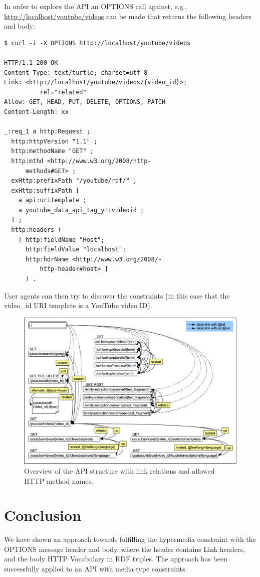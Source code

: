 \documentclass{acm_proc_article-sp}
\begin{document}
In order to explore the API an OPTIONS call against, e.g., \url{http://localhost/youtube/videos} can be made that returns the following headers and body:
\begin{verbatim}
$ curl -i -X OPTIONS http://localhost/youtube/videos

HTTP/1.1 200 OK
Content-Type: text/turtle; charset=utf-8
Link: <http://localhost/youtube/videos/{video_id}>;
          rel="related"
Allow: GET, HEAD, PUT, DELETE, OPTIONS, PATCH
Content-Length: xx

_:req_1 a http:Request ;
  http:httpVersion "1.1" ;
  http:methodName "GET" ;
  http:mthd <http://www.w3.org/2008/http-
      methods#GET> ;
  exHttp:prefixPath "/youtube/rdf/" ;
  exHttp:suffixPath [
    a api:uriTemplate ;
    a youtube_data_api_tag_yt:videoid ;
  ] ;
  http:headers (
    [ http:fieldName "Host";
      http:fieldValue "localhost";
      http:hdrName <http://www.w3.org/2008/-
          http-header#host> ]
      ) .
\end{verbatim}
User agents can then try to discover the constraints (in this case that the {video\_id} URI template is a YouTube video ID).
\begin{figure}
 \centering
 \includegraphics[width=\linewidth]{statemachine.png}
 \caption{Overview of the API structure with link relations and allowed HTTP method names.}
 \label{fig:overview}
\end{figure}

\section{Conclusion}\label{sec:relatedwork}
We have shown an approach towards fulfilling the hypermedia constraint with the OPTIONS message header and body, where the header contains Link headers, and the body HTTP Vocabulary in RDF triples. The approach has been successfully applied to an API with media type constraints.
\end{document}
